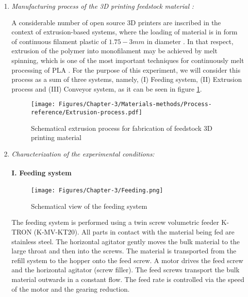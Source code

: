 \begin{enumerate}[leftmargin=0in, label=\emph{\alph*}.]
	
	\item  \textit{Manufacturing  process of the 3D printing feedstock material :}
	
A considerable number of open source 3D printers  are inscribed in the context of extrusion-based systems, where the loading of material is in form of continuous filament plastic of $1.75-3 mm$ in diameter \parencite{Mueller2012, N.Turner2014}.
In that respect, extrusion of the polymer into monofilament may be achieved by melt spinning, which is one of  the most important techniques for continuously melt processing of PLA \parencite{Gupta2007, Lim2008}.
For the purpose of this experiment, we will consider this process as a sum of three systems, namely, (I) Feeding system, (II) Extrusion process and (III) Conveyor system, as it can be seen in figure \ref{Extrusion.process.feedstock.3DP}.
		
		
	\begin{figure} [H]
		\centering
		\centering
		\texttt{[image: Figures/Chapter-3/Materials-methods/Process-reference/Extrusion-process.pdf]}
		\caption{Schematical extrusion process for fabrication of feedstock 3D printing material}
		\label{Extrusion.process.feedstock.3DP}
	\end{figure}
	
	
	\item  \textit{Characterization of the experimental conditions:} 
	
		
	
	\paragraph{I. Feeding system}\hfill
	
	\begin{figure} [H]
		\centering
		\texttt{[image: Figures/Chapter-3/Feeding.png]}
		\caption{Schematical view of the feeding system}
		\label{feeding}
	\end{figure}
	
The feeding system is performed using a twin screw volumetric feeder  K-TRON (K-MV-KT20). 
All parts in contact with the material being fed are stainless steel. 
The horizontal agitator gently moves the bulk material to the large throat and then into the screws. 
The  material  is transported from the refill system to the hopper onto the feed screw. 
A motor drives the feed screw and the horizontal agitator (screw filler). 
The feed screws transport the bulk material outwards in a constant flow. 
The feed rate is controlled via the speed of the motor and the gearing reduction. 
	

\end{enumerate}
